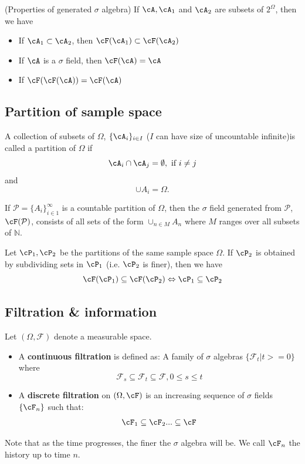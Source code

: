 \begin{refsection}
\begin{corollary}
(Properties of generated $\sigma$ algebra) If $\cA,\cA_1$ and $\cA_2$ are subsets of $2^\Omega$, then we have \cite{dineen2013probability}
\begin{itemize}
    \item If $\cA_1 \subset \cA_2$, then $\cF(\cA_1) \subset \cF(\cA_2)$
    \item If $\cA$ is a $\sigma$ field, then $\cF(\cA) = \cA$
    \item If $\cF(\cF(\cA)) = \cF(\cA)$
\end{itemize}
\end{corollary}


\subsection{Partition of sample space}
\begin{definition}
A collection of subsets of $\Omega$, $\{\cA_i \}_{i\in I}$ ($I$ can have size of uncountable infinite)is called a partition of $\Omega$ if
$$\cA_i \cap \cA_j = \emptyset, ~\text{if}~ i\neq j $$
and $$\cup A_i = \Omega.$$
\end{definition}

\begin{lemma}\cite{dineen2013probability}
If $\mathcal{P}=\{ A_i \}_{i\in 1}^\infty$ is a countable partition of $\Omega$, then the $\sigma$ field generated from $\mathcal{P}$, $\cF(\mathcal{P})$, consists of all sets of the form $\cup_{n\in M} A_n$ where $M$ ranges over all subsets of $\mathbb{N}$.
\end{lemma}

\begin{lemma}
Let $\cP_1,\cP_2$ be the partitions of the same sample space $\Omega$. If $\cP_2$ is obtained by subdividing sets in $\cP_1$ (i.e. $\cP_2$ is finer), then we have
$$\cF(\cP_1)\subseteq \cF(\cP_2) \Leftrightarrow \cP_1 \subseteq \cP_2$$
\end{lemma}

\subsection{Filtration \& information}


\begin{definition}[filtration]
Let $(\Omega,\mathcal{F})$ denote a measurable space.
\begin{itemize}
    \item A \textbf{continuous filtration} is defined as:
A family of $\sigma$ algebras $\{\mathcal{F}_t|t>=0\}$ where 
$$ \mathcal{F}_s \subseteq \mathcal{F}_t \subseteq \mathcal{F}, 0 \leq s \leq t$$
\item A \textbf{discrete filtration} on $(\Omega,\cF)$ is an increasing sequence of $\sigma$ fields $\{\cF_n\}$ such that:
$$\cF_1 \subseteq \cF_2 ... \subseteq \cF$$
\end{itemize}
Note that as the time progresses, the finer the $\sigma$ algebra will be. We call $\cF_n$ the history up to time $n$.
\end{definition}



\end{refsection}
